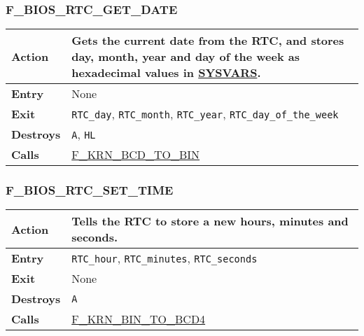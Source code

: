         \subsubsection{F\_BIOS\_RTC\_GET\_DATE}
        \label{func:fbiosrtcgetdate}
        \begin{tabular}{l p{15cm}}
            \hline\textbf{Action}
            & Gets the current date from the \textbf{RTC}, and stores day,
            month, year and day of the week as hexadecimal values in
            \hyperref[sec:ram_memmap]{SYSVARS}.\\
            \hline\textbf{Entry} & None \\
            \hline\textbf{Exit} & \texttt{RTC\_day}, \texttt{RTC\_month},
            \texttt{RTC\_year}, \texttt{RTC\_day\_of\_the\_week} \\
            \hline\textbf{Destroys} & \texttt{A}, \texttt{HL} \\
            \hline\textbf{Calls}
            & \hyperref[func:fkrnbcdtobin]{F\_KRN\_BCD\_TO\_BIN}\\
            \hline
        \end{tabular}

        \subsubsection{F\_BIOS\_RTC\_SET\_TIME}
        \label{func:fbiosrtcsettime}
        \begin{tabular}{l p{15cm}}
            \hline\textbf{Action}
            & Tells the \textbf{RTC} to store a new hours, minutes and seconds. \\
            \hline\textbf{Entry} & \texttt{RTC\_hour}, \texttt{RTC\_minutes},
            \texttt{RTC\_seconds} \\
            \hline\textbf{Exit} & None\\
            \hline\textbf{Destroys} & \texttt{A} \\
            \hline\textbf{Calls}
            & \hyperref[func:fkrnbintobcd4]{F\_KRN\_BIN\_TO\_BCD4}\\
            \hline
        \end{tabular}

